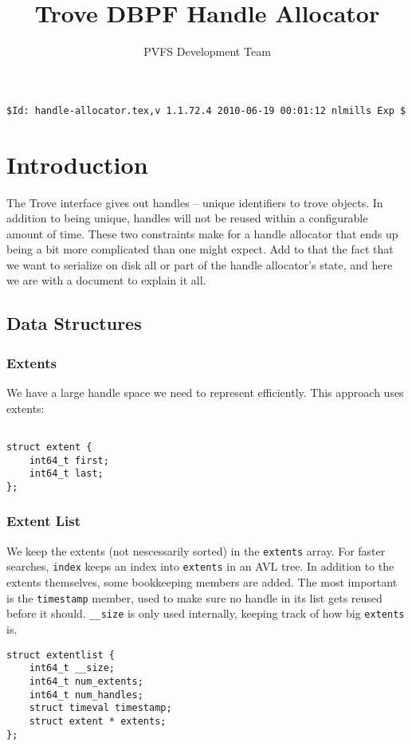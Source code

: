 \documentclass[10pt]{article} %
\title{Trove DBPF Handle Allocator }
\author{PVFS Development Team}
\begin{document}
\maketitle
\begin{verbatim}$Id: handle-allocator.tex,v 1.1.72.4 2010-06-19 00:01:12 nlmills Exp $\end{verbatim}

\section{Introduction}

The Trove interface gives out handles -- unique identifiers to trove
objects.  In addition to being unique, handles will not be reused within
a configurable amount of time.  These two constraints make for a handle
allocator that ends up being a bit more complicated than one might
expect.  Add to that the fact that we want to serialize on disk all or
part of the handle allocator's state, and here we are with a document to
explain it all.

\subsection{Data Structures}
\subsubsection{Extents}
We have a large handle space we need to represent efficiently.  This
approach uses extents:
\begin{verbatim}

struct extent {
	int64_t first;
	int64_t last;
};

\end{verbatim}

\subsubsection{Extent List}
We keep the extents (not nescessarily sorted) in the \texttt{extents}
array.  For faster searches, \texttt{index} keeps an index into
\texttt{extents} in an AVL tree. 
In addition
to the extents themselves, some bookkeeping members are added.  The most
important is the \texttt{timestamp} member, used to make sure no handle in
its list gets reused before it should.  \texttt{\_\_size} is only used
internally, keeping track of how big \texttt{extents} is.  

\begin{verbatim}
struct extentlist {
	int64_t __size;
	int64_t num_extents;
	int64_t num_handles;
	struct timeval timestamp;
	struct extent * extents;
};
\end{verbatim}
\end{document}
